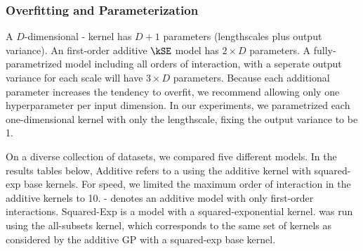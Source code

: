 \subsubsection{Overfitting and Parameterization}
A $D$-dimensional \kSE-\ARD{} kernel has $D +1$ parameters (lengthscales plus output variance). 
An first-order additive $\kSE$ model has $2 \times D$ parameters.
A fully-parametrized model including all orders of interaction, with a seperate output variance for each scale will have $3 \times D$ parameters.
Because each additional parameter increases the tendency to overfit, we recommend allowing only one hyperparameter per input dimension. 
%
%
%
In our experiments, we parametrized each one-dimensional kernel with only the lengthscale, fixing the output variance to be 1.


On a diverse collection of datasets, we compared five different models.
In the results tables below, \gp{} Additive refers to a \gp{} using the additive kernel with squared-exp base kernels.
For speed, we limited the maximum order of interaction in the additive kernels to 10.  \gp{}-\GAM{} denotes an additive \gp{} model with only first-order interactions.  \gp{} Squared-Exp is a \gp{} model with a squared-exponential \ARD{} kernel.  \HKL{}
was run using the all-subsets kernel, which corresponds to the same set of kernels as considered by the additive GP with a squared-exp base kernel.     

